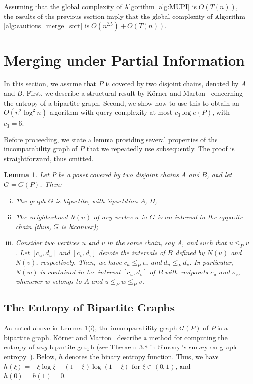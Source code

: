 \documentclass{article} \usepackage{fullpage}
\newtheorem{lemma}{Lemma}
\begin{document}
Assuming that the global complexity of Algorithm \ref{alg:MUPI} is $O(T(n))$, the results of the previous section imply that the global complexity of Algorithm \ref{alg:cautious_merge_sort} is $O(n^{2.5}) + O(T(n))$.

\section{Merging under Partial Information}
\label{sec:MUPIsec}

In this section, we assume that $P$ is covered by two disjoint chains, denoted by $A$ and $B$. First, we describe a structural result by K\"orner and Marton~\cite{KM88} concerning the entropy of a bipartite graph. Second, we show how to use this to obtain an $O(n^2 \log^2 n)$ algorithm with query complexity at most $c_3 \log e(P)$, with $c_3 = 6$.

Before proceeding, we state a lemma providing several properties of the incomparability graph of $P$ that we repeatedly use subsequently. The proof is straightforward, thus omitted.

\begin{lemma}
\label{lem:width_2_prop}
Let $P$ be a poset covered by two disjoint chains $A$ and $B$, and let $G = \bar{G}(P)$. Then:
\begin{enumerate}[(i)]
\item The graph $G$ is bipartite, with bipartition $A$, $B$;
\item The neighborhood $N(u)$ of any vertex $u$ in $G$ is an interval in the opposite chain (thus, $G$ is {\em biconvex});
\item Consider two vertices $u$ and $v$ in the same chain, say $A$, and such that $u \leqslant_P v$. Let $[c_u,d_u]$ and $[c_v,d_v]$ denote the intervals of $B$ defined by $N(u)$ and $N(v)$, respectively. Then, we have $c_u \leqslant_P c_v$ and $d_u \leqslant_P d_v$. In particular, $N(w)$ is contained in the interval $[c_u,d_v]$ of $B$ with endpoints $c_u$ and $d_v$, whenever $w$ belongs to $A$ and $u \leqslant_P w \leqslant_P v$.
\end{enumerate}
\end{lemma}

\subsection{The Entropy of Bipartite Graphs}
\label{sec:H_bip}

As noted above in Lemma \ref{lem:width_2_prop}(i), the incomparability graph $\bar{G}(P)$ of $P$ is a bipartite graph. K\"orner and Marton~\cite{KM88} describe a method for computing the entropy of {\sl any\/} bipartite graph (see Theorem 3.8 in Simonyi's survey on graph entropy~\cite{S95}). Below, $h$ denotes the binary entropy function. Thus, we have $h(\xi) = -\xi \log \xi - (1-\xi) \log (1-\xi)$ for $\xi \in (0,1)$, and $h(0) = h(1) = 0$.
\end{document}
